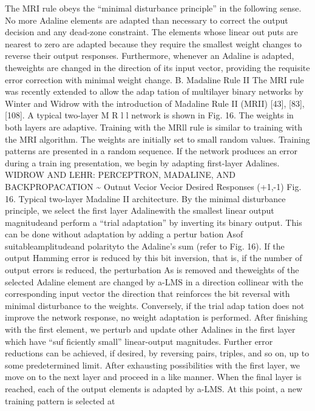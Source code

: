\documentclass[11pt,a4paper,twocolumn]{article}
\begin{document}
{The MRI rule obeys the “minimal disturbance principle” 
in the following sense. No more Adaline elements are 
adapted than necessary to correct the output decision and 
any dead-zone constraint. The elements whose linear out
puts are nearest to zero are adapted because they require 
the smallest weight changes to reverse their output 
responses. Furthermore, whenever an Adaline is adapted, 
theweights are changed in the direction of its input vector, 
providing the requisite error correction with minimal 
weight change. 
B. Madaline Rule II 
The MRI rule was recently extended to allow the adap
tation of multilayer binary networks by Winter and Widrow 
with the introduction of Madaline Rule II (MRII) [43], [83], 
[108]. A typical two-layer M R l l  network is shown in Fig. 16. 
The weights in both layers are adaptive. 
Training with the MRll rule is similar to training with the 
MRI algorithm. The weights are initially set to small random 
values. Training patterns are presented in a random 
sequence. If the network produces an error during a train
ing presentation, we begin by adapting first-layer Adalines. 
WIDROW AND LEHR: PERCEPTRON, MADALINE, AND BACKPROPACATION 
\~{} 
Outnut 
Vecior 
Vecior 
Desired Responses 
(+1,-1) 
Fig. 16. Typical two-layer Madaline II architecture. 
By the minimal disturbance principle, we select the first
layer Adalinewith the smallest linear output magnitudeand 
perform a “trial adaptation” by inverting its binary output. 
This can be done without adaptation by adding a pertur
bation Asof suitableamplitudeand polarityto the Adaline’s 
sum (refer to Fig. 16). If the output Hamming error is reduced 
by this bit inversion, that is, if the number of output errors 
is reduced, the perturbation As is removed and theweights 
of the selected Adaline element are changed by a-LMS in 
a direction collinear with the corresponding input vector
the direction that reinforces the bit reversal with minimal 
disturbance to the weights. Conversely, if the trial adap
tation does not improve the network response, no weight 
adaptation is performed. 
After finishing with the first element, we perturb and 
update other Adalines in the first layer which have “suf
ficiently small” linear-output magnitudes. Further error 
reductions can be achieved, if desired, by reversing pairs, 
triples, and so on, up to some predetermined limit. After 
exhausting possibilities with the first layer, we move on to 
the next layer and proceed in a like manner. When the final 
layer is reached, each of the output elements is adapted by 
a-LMS. At this point, a new training pattern is selected at 
}
\end{document}
